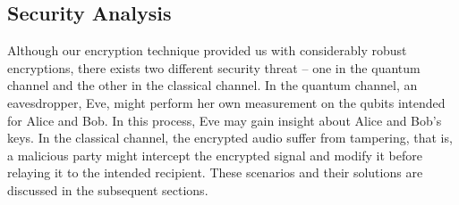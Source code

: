 \documentclass[a4paper]{cas-sc}
\begin{document}
\subsection{Security Analysis}
Although our encryption technique provided us with considerably robust encryptions, there exists two different security threat -- one in the quantum channel and the other in the classical channel. In the quantum channel, an eavesdropper, Eve, might perform her own measurement on the qubits intended for Alice and Bob. In this process, Eve may gain insight about Alice and Bob's keys. In the classical channel, the encrypted audio suffer from tampering, that is, a malicious party might intercept the encrypted signal and modify it before relaying it to the intended recipient. These scenarios and their solutions are discussed in the subsequent sections.
\end{document}
